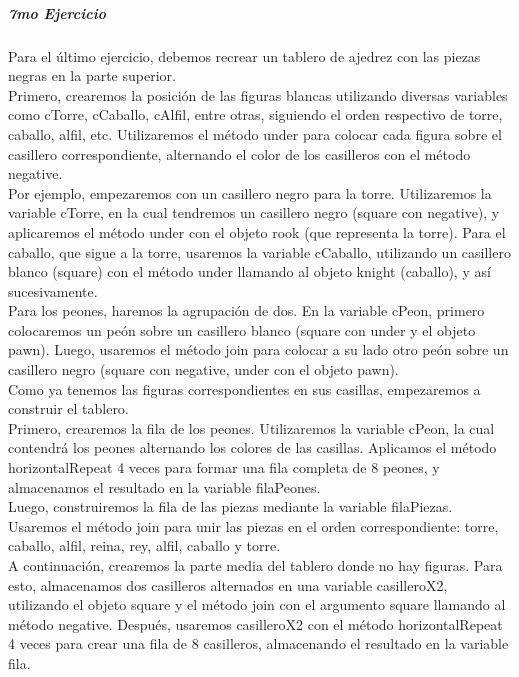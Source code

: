 \documentclass[10pt, a4paper]{article}
\begin{document}
	\subparagraph*{7mo Ejercicio}
		\begin{flushleft}
			Para el último ejercicio, debemos recrear un tablero de ajedrez con las piezas negras en la parte superior.\\	
			Primero, crearemos la posición de las figuras blancas utilizando diversas variables como cTorre, cCaballo, cAlfil, entre otras, siguiendo el orden respectivo de torre, caballo, alfil, etc. Utilizaremos el método under para colocar cada figura sobre el casillero correspondiente, alternando el color de los casilleros con el método negative.	\\		
			Por ejemplo, empezaremos con un casillero negro para la torre. Utilizaremos la variable cTorre, en la cual tendremos un casillero negro (square con negative), y aplicaremos el método under con el objeto rook (que representa la torre). Para el caballo, que sigue a la torre, usaremos la variable cCaballo, utilizando un casillero blanco (square) con el método under llamando al objeto knight (caballo), y así sucesivamente. \\			
			Para los peones, haremos la agrupación de dos. En la variable cPeon, primero colocaremos un peón sobre un casillero blanco (square con under y el objeto pawn). Luego, usaremos el método join para colocar a su lado otro peón sobre un casillero negro (square con negative, under con el objeto pawn).\\
			Como ya tenemos las figuras correspondientes en sus casillas, empezaremos a construir el tablero.\\	
			Primero, crearemos la fila de los peones. Utilizaremos la variable cPeon, la cual contendrá los peones alternando los colores de las casillas. Aplicamos el método horizontalRepeat 4 veces para formar una fila completa de 8 peones, y almacenamos el resultado en la variable filaPeones.	\\		
			Luego, construiremos la fila de las piezas mediante la variable filaPiezas. Usaremos el método join para unir las piezas en el orden correspondiente: torre, caballo, alfil, reina, rey, alfil, caballo y torre.	\\		
			A continuación, crearemos la parte media del tablero donde no hay figuras. Para esto, almacenamos dos casilleros alternados en una variable casilleroX2, utilizando el objeto square y el método join con el argumento square llamando al método negative. Después, usaremos casilleroX2 con el método horizontalRepeat 4 veces para crear una fila de 8 casilleros, almacenando el resultado en la variable fila.	\\		

\end{flushleft}
\end{document}
